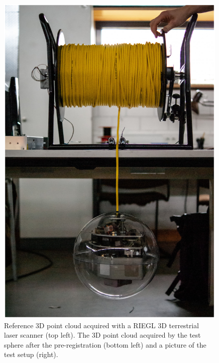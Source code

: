 \begin{figure}
\begin{minipage}[c]{0.2075\textwidth}
	  		\includegraphics[width=\textwidth]{./images/lidarsetup}
	  	\end{minipage}
		\caption{Reference 3D point cloud acquired with a RIEGL 3D terrestrial laser scanner (top left). The 3D point cloud acquired by the test sphere after the pre-registration (bottom left) and a picture of the test setup (right).}
		\label{fig:experimental-setup}
	\end{figure}
\fi


